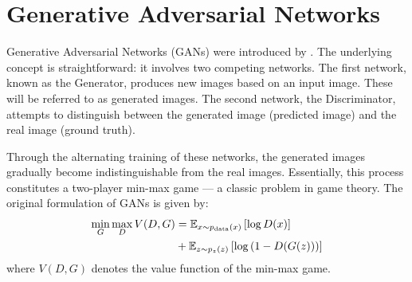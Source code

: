 \section{Generative Adversarial Networks}
Generative Adversarial Networks (GANs) were introduced by \cite{goodfellow2014generative}. The underlying concept is straightforward: it involves two competing networks. The first network, known as the Generator, produces new images based on an input image. These will be referred to as generated images. The second network, the Discriminator, attempts to distinguish between the generated image (predicted image) and the real image (ground truth).

Through the alternating training of these networks, the generated images gradually become indistinguishable from the real images. Essentially, this process constitutes a two-player min-max game --- a classic problem in game theory. The original formulation of GANs is given by:
\begin{equation}
	\centering
	\begin{aligned}
		\min_{G} \max_{D} V(D, G) &= \mathbb{E}_{x \sim p_{\rm data}(x)} \left[ \log D(x) \right] \\
		&+ \mathbb{E}_{z \sim p_{z}(z)} \left[ \log \left( 1-D(G(z)) \right) \right]
	\end{aligned}
	\label{eq:Basic_GAN}
\end{equation}
where $V(D, G)$ denotes the value function of the min-max game.

